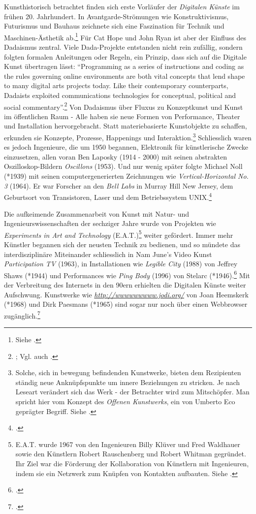 \documentclass[
paper=164mm:234mm, %
pagesize, %
DIV=calc, %
10pt, %
parskip=half- %
]{scrbook}
\begin{document}
Kunsthistorisch betrachtet finden sich erste Vorläufer der \emph{Digitalen Künste} im frühen 20. Jahrhundert. In Avantgarde-Strömungen wie Konstruktivismus, Futurismus und Bauhaus zeichnete sich eine Faszination für Technik und Maschinen-Ästhetik ab.\footnote{Siehe \cite[39]{Hope-Ryan:2014}.} Für Cat Hope und John Ryan ist aber der Einfluss des Dadaismus zentral. Viele Dada-Projekte entstanden nicht rein zufällig, sondern folgten formalen Anleitungen oder Regeln, ein Prinzip, dass sich auf die Digitale Kunst übertragen lässt: \enquote{Programming as a series of instructions and coding as the rules governing online environments are both vital concepts that lend shape to many digital arts projects today. Like their contemporary counterparts, Dadaists exploited communications technologies for conceptual, political and social commentary}.\footnote{\cite[40]{Hope-Ryan:2014}; Vgl. auch \cite{Taylor:2014}.} Von Dadaismus über Fluxus zu Konzeptkunst und Kunst im öffentlichen Raum - Alle haben sie neue Formen von Performance, Theater und Installation hervorgebracht. Statt materiebasierte Kunstobjekte zu schaffen, erkunden sie Konzepte, Prozesse, Happenings und Interaktion.\footnote{Solche, sich in bewegung befindenden Kunstwerke, bieten dem Rezipienten ständig neue Anknüpfspunkte um innere Beziehungen zu stricken. Je nach Leseart verändert sich das Werk - der Betrachter wird zum Mitschöpfer. Man spricht hier vom Konzept des \emph{Offenen Kunstwerks}, ein von Umberto Eco geprägter Begriff. Siehe \cite{Eco:1973}.} Schliesslich waren es jedoch Ingenieure, die um 1950 begannen, Elektronik für künstlerische Zwecke einzusetzen, allen voran Ben Laposky (1914 - 2000) mit seinen abstrakten Oszilloskop-Bildern \emph{Oscillons} (1953). Und nur wenig später folgte Michael Noll (*1939) mit seinen computergenerierten Zeichnungen wie \emph{Vertical-Horizontal No. 3} (1964). Er war Forscher an den \emph{Bell Labs} in Murray Hill New Jersey, dem Geburtsort von Transistoren, Laser und dem Betriebssystem UNIX.\footnote{\cite[24]{Wands:2006}.}

Die aufkeimende Zusammenarbeit von Kunst mit Natur- und Ingenieurswissenschaften der sechziger Jahre wurde von Projekten wie \emph{Experiments in Art and Technology} (E.A.T.)\footnote{E.A.T. wurde 1967 von den Ingenieuren Billy Klüver und Fred Waldhauer sowie den Künstlern Robert Rauschenberg und Robert Whitman gegründet. Ihr Ziel war die Förderung der Kollaboration von Künstlern mit Ingenieuren, indem sie ein Netzwerk zum Knüpfen von Kontakten aufbauten. Siehe \cite[16]{Paul:2003}.} weiter gefördert. Immer mehr Künstler begannen sich der neusten Technik zu bedienen, und so mündete das interdisziplinäre Miteinander schliesslich in Nam June's Video Kunst \emph{Participation TV} (1963), in Installationen wie \emph{Legible City} (1988) von Jeffrey Shaws (*1944) und Performances wie \emph{Ping Body} (1996) von Stelarc (*1946).\footnote{\cite[96]{Graham:2007}.} Mit der Verbreitung des Internets in den 90ern erhielten die Digitalen Künste weiter Aufschwung. Kunstwerke wie \emph{\url{http://wwwwwwwww.jodi.org/}} von Joan Heemskerk (*1968) und Dirk Paesmans (*1965) sind sogar nur noch über einen Webbrowser zugänglich.\footnote{\cite[128]{Hope-Ryan:2014}.}
\end{document}
